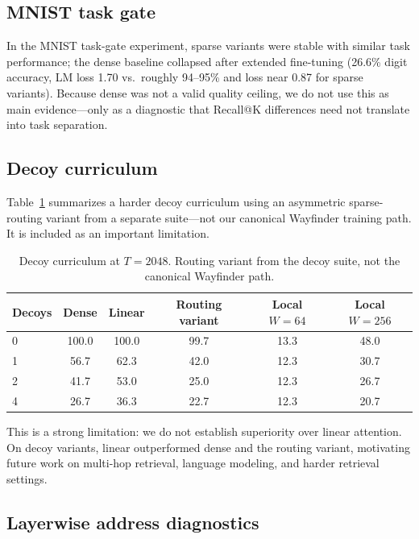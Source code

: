 \documentclass{article}
\begin{document}
\subsection{MNIST task gate}

In the MNIST task-gate experiment, sparse variants were stable with similar task performance; the dense baseline collapsed after extended fine-tuning (26.6\% digit accuracy, LM loss 1.70 vs.\ roughly 94--95\% and loss near 0.87 for sparse variants). Because dense was not a valid quality ceiling, we do not use this as main evidence---only as a diagnostic that Recall@K differences need not translate into task separation.

\subsection{Decoy curriculum}

Table~\ref{tab:decoy} summarizes a harder decoy curriculum using an asymmetric sparse-routing variant from a separate suite---not our canonical Wayfinder training path. It is included as an important limitation.

\begin{table}[H]
\caption{Decoy curriculum at $T{=}2048$. Routing variant from the decoy suite, not the canonical Wayfinder path.}
\centering
\small
\begin{tabular}{lccccc}
\toprule
Decoys & Dense & Linear & Routing variant & Local $W=64$ & Local $W=256$ \\
\midrule
0 & 100.0 & 100.0 & 99.7 & 13.3 & 48.0 \\
1 & 56.7 & 62.3 & 42.0 & 12.3 & 30.7 \\
2 & 41.7 & 53.0 & 25.0 & 12.3 & 26.7 \\
4 & 26.7 & 36.3 & 22.7 & 12.3 & 20.7 \\
\bottomrule
\end{tabular}
\label{tab:decoy}
\end{table}

This is a strong limitation: we do not establish superiority over linear attention. On decoy variants, linear outperformed dense and the routing variant, motivating future work on multi-hop retrieval, language modeling, and harder retrieval settings.

\subsection{Layerwise address diagnostics}
\end{document}
